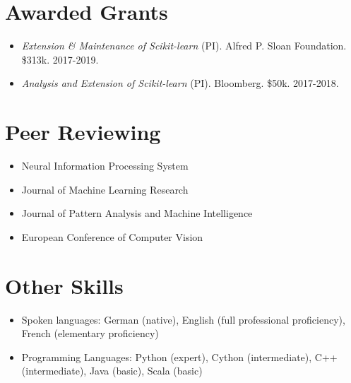 \documentclass[a4paper,11pt]{article}
\begin{document}
\section{Awarded Grants}
\begin{itemize}
    \item \emph{Extension \& Maintenance of Scikit-learn} (PI). Alfred P. Sloan Foundation. \$313k. 2017-2019.
    \item \emph{Analysis and Extension of Scikit-learn} (PI). Bloomberg. \$50k. 2017-2018.
\end{itemize}

\section{Peer Reviewing}
\begin{itemize}
    \item Neural Information Processing System
    \item Journal of Machine Learning Research
    \item Journal of Pattern Analysis and Machine Intelligence
    \item European Conference of Computer Vision
\end{itemize}

\section{Other Skills}
\begin{itemize}
    \item Spoken languages: German (native), English (full professional proficiency), French (elementary proficiency)
    \item Programming Languages: Python (expert), Cython (intermediate), C++ (intermediate), Java (basic), Scala (basic)
\end{itemize}

\begin{publications}
\end{publications}
\end{document}
